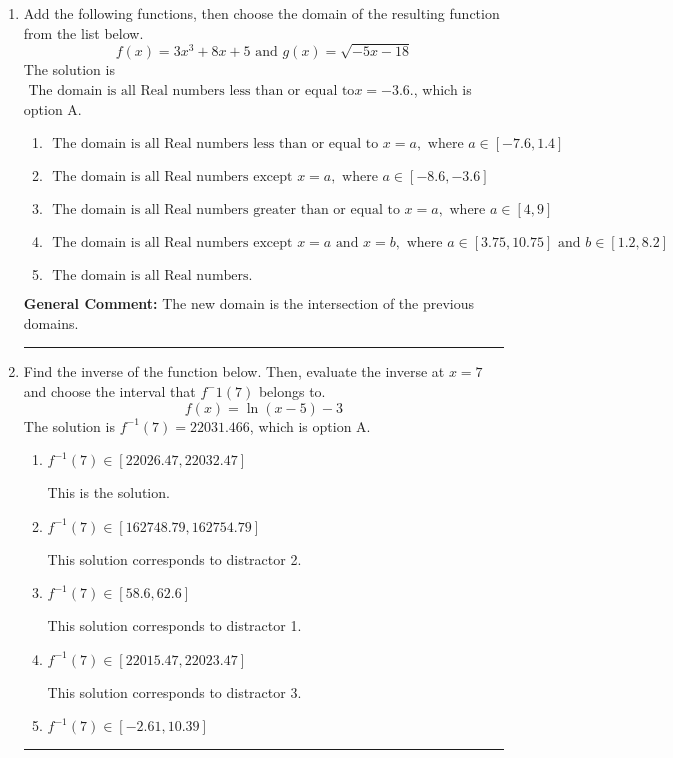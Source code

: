 \documentclass{extbook}[14pt]
\newcommand{\litem}[1]{\item #1

\rule{\textwidth}{0.4pt}}
\begin{document}
\begin{enumerate}\litem{
Add the following functions, then choose the domain of the resulting function from the list below.
\[ f(x) = 3x^{3} +8 x + 5 \text{ and } g(x) = \sqrt{-5x-18}  \]The solution is \( \text{ The domain is all Real numbers less than or equal to} x = -3.6. \), which is option A.\begin{enumerate}[label=\Alph*.]
\item \( \text{ The domain is all Real numbers less than or equal to } x = a, \text{ where } a \in [-7.6, 1.4] \)


\item \( \text{ The domain is all Real numbers except } x = a, \text{ where } a \in [-8.6, -3.6] \)


\item \( \text{ The domain is all Real numbers greater than or equal to } x = a, \text{ where } a \in [4, 9] \)


\item \( \text{ The domain is all Real numbers except } x = a \text{ and } x = b, \text{ where } a \in [3.75, 10.75] \text{ and } b \in [1.2, 8.2] \)


\item \( \text{ The domain is all Real numbers. } \)


\end{enumerate}

\textbf{General Comment:} The new domain is the intersection of the previous domains.
}
\litem{
Find the inverse of the function below. Then, evaluate the inverse at $x = 7$ and choose the interval that $f^-1(7)$ belongs to.
\[ f(x) = \ln{(x-5)}-3 \]The solution is \( f^{-1}(7) = 22031.466 \), which is option A.\begin{enumerate}[label=\Alph*.]
\item \( f^{-1}(7) \in [22026.47, 22032.47] \)

 This is the solution.
\item \( f^{-1}(7) \in [162748.79, 162754.79] \)

 This solution corresponds to distractor 2.
\item \( f^{-1}(7) \in [58.6, 62.6] \)

 This solution corresponds to distractor 1.
\item \( f^{-1}(7) \in [22015.47, 22023.47] \)

 This solution corresponds to distractor 3.
\item \( f^{-1}(7) \in [-2.61, 10.39] \)


\end{enumerate}}
\end{enumerate}
\end{document}
